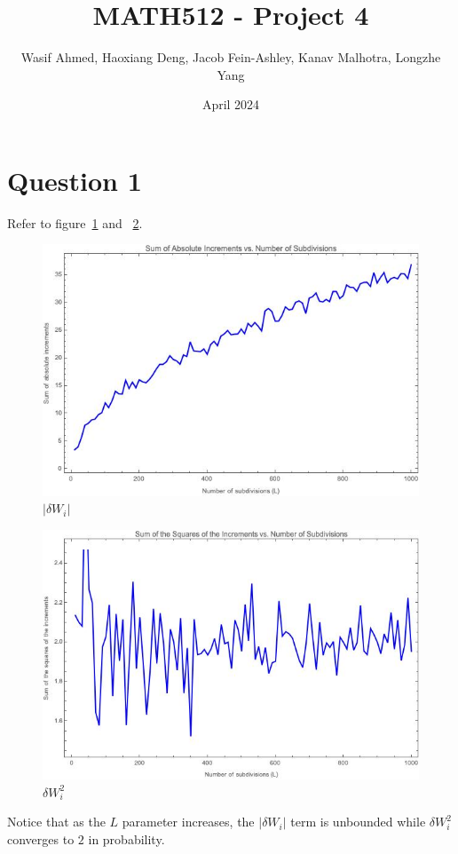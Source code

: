 \documentclass{article}
\title{MATH512 - Project 4}
\author{Wasif Ahmed, Haoxiang Deng, Jacob Fein-Ashley, Kanav Malhotra, Longzhe Yang}
\date{April 2024}
\begin{document}
\maketitle

\section*{Question 1}

Refer to figure~\ref{fig:abssum} and ~\ref{fig:sqrsum}. 

\begin{figure}[H]
    \centering
    \includegraphics[scale=0.6]{imgs/AbsSum.jpeg}
    \caption{$|\delta W_i|$}
    \label{fig:abssum}
\end{figure}

\begin{figure}[H]
    \centering
    \includegraphics[scale=0.6]{imgs/SqrSum.jpeg}
    \caption{$\delta W_i^2$}
    \label{fig:sqrsum}
\end{figure}
Notice that as the $L$ parameter increases, the $|\delta W_i|$ term is unbounded while $\delta W_i^2$ converges to $2$ in probability.
\end{document}
